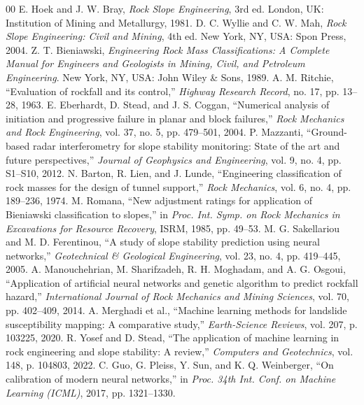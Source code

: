 \documentclass[conference]{IEEEtran}
\begin{document}
\begin{thebibliography}{00}
 E. Hoek and J. W. Bray, \textit{Rock Slope Engineering}, 3rd ed. London, UK: Institution of Mining and Metallurgy, 1981.
 D. C. Wyllie and C. W. Mah, \textit{Rock Slope Engineering: Civil and Mining}, 4th ed. New York, NY, USA: Spon Press, 2004.
 Z. T. Bieniawski, \textit{Engineering Rock Mass Classifications: A Complete Manual for Engineers and Geologists in Mining, Civil, and Petroleum Engineering}. New York, NY, USA: John Wiley \& Sons, 1989.
 A. M. Ritchie, ``Evaluation of rockfall and its control,'' \textit{Highway Research Record}, no. 17, pp. 13--28, 1963.
 E. Eberhardt, D. Stead, and J. S. Coggan, ``Numerical analysis of initiation and progressive failure in planar and block failures,'' \textit{Rock Mechanics and Rock Engineering}, vol. 37, no. 5, pp. 479--501, 2004.
 P. Mazzanti, ``Ground-based radar interferometry for slope stability monitoring: State of the art and future perspectives,'' \textit{Journal of Geophysics and Engineering}, vol. 9, no. 4, pp. S1--S10, 2012.
 N. Barton, R. Lien, and J. Lunde, ``Engineering classification of rock masses for the design of tunnel support,'' \textit{Rock Mechanics}, vol. 6, no. 4, pp. 189--236, 1974.
 M. Romana, ``New adjustment ratings for application of Bieniawski classification to slopes,'' in \textit{Proc. Int. Symp. on Rock Mechanics in Excavations for Resource Recovery}, ISRM, 1985, pp. 49--53.
 M. G. Sakellariou and M. D. Ferentinou, ``A study of slope stability prediction using neural networks,'' \textit{Geotechnical \& Geological Engineering}, vol. 23, no. 4, pp. 419--445, 2005.
 A. Manouchehrian, M. Sharifzadeh, R. H. Moghadam, and A. G. Osgoui, ``Application of artificial neural networks and genetic algorithm to predict rockfall hazard,'' \textit{International Journal of Rock Mechanics and Mining Sciences}, vol. 70, pp. 402--409, 2014.
 A. Merghadi et al., ``Machine learning methods for landslide susceptibility mapping: A comparative study,'' \textit{Earth-Science Reviews}, vol. 207, p. 103225, 2020.
 R. Yosef and D. Stead, ``The application of machine learning in rock engineering and slope stability: A review,'' \textit{Computers and Geotechnics}, vol. 148, p. 104803, 2022.
 C. Guo, G. Pleiss, Y. Sun, and K. Q. Weinberger, ``On calibration of modern neural networks,'' in \textit{Proc. 34th Int. Conf. on Machine Learning (ICML)}, 2017, pp. 1321--1330.

\end{thebibliography}
\end{document}
